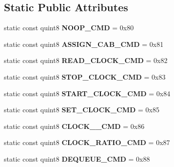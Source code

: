 \subsection*{Static Public Attributes}
\begin{DoxyCompactItemize}
\item 
\mbox{\label{class_n_c_e_message_a8ef313ccd6c59b55d14c466865999c81}} 
static const quint8 {\bfseries N\+O\+O\+P\+\_\+\+C\+MD} = 0x80
\item 
\mbox{\label{class_n_c_e_message_a93a9ca65ec9f484274a92d589e9f688f}} 
static const quint8 {\bfseries A\+S\+S\+I\+G\+N\+\_\+\+C\+A\+B\+\_\+\+C\+MD} = 0x81
\item 
\mbox{\label{class_n_c_e_message_af9bb9ad4db1b3623cbb346fd7e324991}} 
static const quint8 {\bfseries R\+E\+A\+D\+\_\+\+C\+L\+O\+C\+K\+\_\+\+C\+MD} = 0x82
\item 
\mbox{\label{class_n_c_e_message_ab0f451e3bf5b078f9c26f55e468b2e67}} 
static const quint8 {\bfseries S\+T\+O\+P\+\_\+\+C\+L\+O\+C\+K\+\_\+\+C\+MD} = 0x83
\item 
\mbox{\label{class_n_c_e_message_a159c08d633927ac84282d09a41e1ad0d}} 
static const quint8 {\bfseries S\+T\+A\+R\+T\+\_\+\+C\+L\+O\+C\+K\+\_\+\+C\+MD} = 0x84
\item 
\mbox{\label{class_n_c_e_message_a7a0fd35d38156eca70a6f98855eb1cbc}} 
static const quint8 {\bfseries S\+E\+T\+\_\+\+C\+L\+O\+C\+K\+\_\+\+C\+MD} = 0x85
\item 
\mbox{\label{class_n_c_e_message_a4d80eabc10732e8c027423fb7b58dddb}} 
static const quint8 {\bfseries C\+L\+O\+C\+K\+\_\+\_\+\+C\+MD} = 0x86
\item 
\mbox{\label{class_n_c_e_message_a5ed9e5ed3e0ab472612186948c4337c3}} 
static const quint8 {\bfseries C\+L\+O\+C\+K\+\_\+\+R\+A\+T\+I\+O\+\_\+\+C\+MD} = 0x87
\item 
\mbox{\label{class_n_c_e_message_ae99776528295bc12b5183f9568b1bb63}} 
static const quint8 {\bfseries D\+E\+Q\+U\+E\+U\+E\+\_\+\+C\+MD} = 0x88

\end{DoxyCompactItemize}
